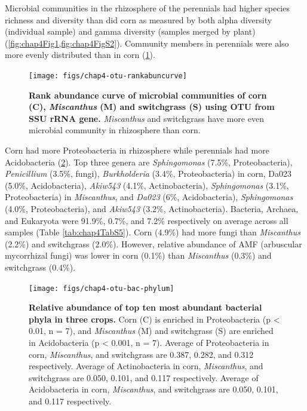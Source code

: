 \documentclass[]{msu-thesis}
\begin{document}
Microbial communities in the rhizosphere of the perennials had higher
species richness and diversity than did corn as measured by both alpha
diversity (individual sample) and gamma diversity (samples merged by
plant) (\cref{fig:chap4Fig1,fig:chap4FigS2}). Community members in
perennials were also more evenly distributed than in corn (\cref{fig:chap4FigS3}).

\begin{figure}[tbph!]
  \centering
  \texttt{[image: figs/chap4-otu-rankabuncurve]}
  \caption[Rank abundance curve of microbial communities of corn (C),
  \textit{Miscanthus} (M) and switchgrass (S) using OTU from SSU rRNA
gene]{\textbf{Rank abundance curve of microbial communities of corn (C),
  \textit{Miscanthus} (M) and switchgrass (S) using OTU from SSU rRNA
gene.} \textit{Miscanthus} and switchgrass have more even microbial
community in rhizosphere than corn.}
  \label{fig:chap4FigS3}
\end{figure}



Corn had more Proteobacteria in rhizosphere while perennials had more
Acidobacteria (\cref{fig:chap4Fig2}). Top three genera are
\textit{Sphingomonas} (7.5\%, Proteobacteria), \textit{Penicillium}
(3.5\%, fungi), \textit{Burkholderia} (3.4\%, Proteobacteria) in corn,
Da023 (5.0\%, Acidobacteria), \textit{Akiw543} (4.1\%, Actinobacteria),
\textit{Sphingomonas} (3.1\%, Proteobacteria) in \textit{Miscanthus}, and
\textit{Da023} (6\%, Acidobacteria), \textit{Sphingomonas} (4.0\%,
Proteobacteria), and \textit{Akiw543} (3.2\%, Actinobacteria). Bacteria,
Archaea, and Eukaryota were 91.9\%, 0.7\%, and 7.2\% respectively on
average across all samples (Table \ref{tab:chap4TabS5}). Corn (4.9\%)
had more fungi than \textit{Miscanthus} (2.2\%) and switchgrass (2.0\%). However,
relative abundance of AMF (arbuscular mycorrhizal fungi) was lower in
corn (0.1\%) than \textit{Miscanthus} (0.3\%) and switchgrass (0.4\%).


\begin{figure}[tbph!]
  \centering
  \texttt{[image: figs/chap4-otu-bac-phylum]}
  \caption[Relative abundance of top ten most abundant bacterial phyla
  in three crops]{\textbf{Relative abundance of top ten most abundant
  bacterial phyla in three crops.} Corn (C) is enriched in
  Proteobacteria (p < 0.01, n = 7), and \textit{Miscanthus} (M) and
  switchgrass (S) are enriched in Acidobacteria (p < 0.001, n = 7).
  Average of Proteobacteria in corn, \textit{Miscanthus}, and
  switchgrass are 0.387, 0.282, and 0.312 respectively. Average of
  Actinobacteria in corn, \textit{Miscanthus}, and switchgrass are
  0.050, 0.101, and 0.117 respectively. Average of Acidobacteria in
  corn, \textit{Miscanthus}, and switchgrass are 0.050, 0.101, and 0.117
respectively.}
  \label{fig:chap4Fig2}
\end{figure}
\end{document}
